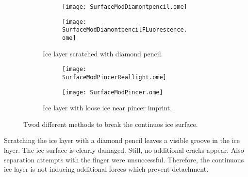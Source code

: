 \begin{figure}[hbt!]
	\centering
	\begin{subfigure}[]{\textwidth}
		\centering
		\begin{subfigure}[]{0.45\textwidth}
			\centering
			\texttt{[image: SurfaceModDiamontpencil.ome]}
		\end{subfigure}	
		\begin{subfigure}[]{0.45\textwidth}
			\centering
			\texttt{[image: SurfaceModDiamontpencilFLuorescence.ome]}
		\end{subfigure}
		\caption{Ice layer scratched with diamond pencil.}
		\label{fig:ScratchedSample}	
	\end{subfigure}
	\begin{subfigure}[]{\textwidth}
		\centering
		\begin{subfigure}[]{0.45\textwidth}
			\centering		
			\texttt{[image: SurfaceModPincerReallight.ome]}	
		\end{subfigure}
		\begin{subfigure}[]{0.45\textwidth}
			\centering
			\texttt{[image: SurfaceModPincer.ome]}	
		\end{subfigure}
		\caption{Ice layer with loose ice near pincer imprint.}
		\label{fig:PincerImprint}
	\end{subfigure}
	\caption{Twod different methods to break the continuos ice surface.}
	\label{fig:SurfaceMod}
\end{figure}

Scratching the ice layer with a diamond pencil leaves a visible groove in the ice layer. The ice surface is clearly damaged. Still, no additional cracks appear. Also separation attempts with the finger were unsuccessful. Therefore, the continuous ice layer is not inducing additional forces which prevent detachment.


\FloatBarrier



